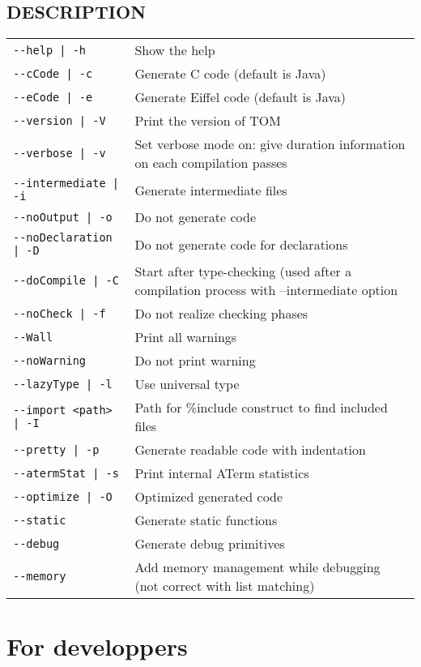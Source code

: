 \subsection{DESCRIPTION}
\begin{tabular}{|l|l|}
\hline
\verb#--help | -h#&            Show the help \\
\verb#--cCode | -c#&           Generate C code (default is Java)\\
\verb#--eCode | -e#&           Generate Eiffel code (default is Java)\\
\verb#--version | -V#&         Print the version of TOM\\
\verb#--verbose | -v#&         Set verbose mode on: give duration
                               information on each compilation passes\\
\verb#--intermediate | -i#&    Generate intermediate files \\
\verb#--noOutput | -o#&        Do not generate code \\
\verb#--noDeclaration | -D#&   Do not generate code for declarations \\
\verb#--doCompile | -C#&       Start after type-checking (used after a
                               compilation process with --intermediate option\\
\verb#--noCheck | -f#&         Do not realize checking phases \\
\verb#--Wall#&       Print all warnings \\
\verb#--noWarning#&       Do not print warning \\
\verb#--lazyType | -l#&        Use universal type \\
\verb#--import <path> | -I#&   Path for \%include construct to find included files\\
\verb#--pretty | -p#&          Generate readable code with indentation \\
\verb#--atermStat | -s#&       Print internal ATerm statistics \\
\verb#--optimize | -O#&        Optimized generated code \\
\verb#--static#&               Generate static functions \\
\verb#--debug#&                Generate debug primitives \\
\verb#--memory#&               Add memory management while debugging (not correct with list matching)\\
\hline
\end{tabular}

\section{For developpers}\label{developpers}
